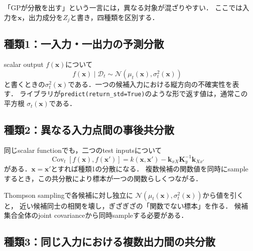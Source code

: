 \documentclass[a4paper,11pt]{ltjsarticle}
\newcommand{\N}{\mathcal N}
\newcommand{\D}{\mathcal D}
\newcommand{\Cov}{\operatorname{Cov}}
\newcommand{\code}[1]{\nolinkurl{#1}}
\begin{document}
「GPが分散を出す」という一言には，異なる対象が混ざりやすい．
ここでは入力を\(\bm x\)，出力成分を\(Z_j\)と書き，四種類を区別する．

\subsection{種類1：一入力・一出力の予測分散}

scalar output \(f(\bm x)\)について
\begin{equation}
  f(\bm x)\mid\D_t
  \sim\N(\mu_t(\bm x),\sigma_t^2(\bm x))
  \label{eq:scalar-posterior-repeated}
\end{equation}
と書くときの\(\sigma_t^2(\bm x)\)である．一つの候補入力における縦方向の不確実性を表す．
ライブラリが\code{predict(return\_std=True)}のような形で返す値は，通常この平方根
\(\sigma_t(\bm x)\)である．

\subsection{種類2：異なる入力点間の事後共分散}

同じscalar functionでも，二つのtest inputsについて
\begin{equation}
  \Cov_t[f(\bm x),f(\bm x')]
  =k(\bm x,\bm x')
  -\bm k_{xX}\bm K_y^{-1}\bm k_{Xx'}
  \label{eq:posterior-cross-input-covariance}
\end{equation}
がある．\(\bm x=\bm x'\)とすれば種類1の分散になる．
複数候補の関数値を同時にsampleするとき，この共分散により標本が一つの関数らしくつながる．

\begin{cautionbox}[各候補を独立な正規乱数としてsampleしない]
Thompson samplingで各候補に対し独立に
\(\N(\mu_t(\bm x),\sigma_t^2(\bm x))\)から値を引くと，
近い候補同士の相関を壊し，ぎざぎざの「関数でない標本」を作る．
候補集合全体のjoint covarianceから同時sampleする必要がある．
\end{cautionbox}

\subsection{種類3：同じ入力における複数出力間の共分散}
\end{document}
